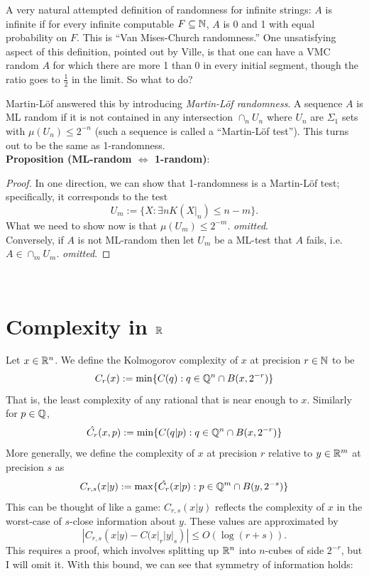 \documentclass{amsart}
\begin{document}
	A very natural attempted definition of randomness for infinite strings: $A$ is infinite if for every infinite computable $F\subseteq \mathbb{N}$, $A$ is 0 and 1 with equal probability on $F$. This is ``Van Mises-Church randomness.'' One unsatisfying aspect of this definition, pointed out by Ville, is that one can have a VMC random $A$ for which there are more 1 than 0 in every initial segment, though the ratio goes to $\tfrac12$ in the limit. So what to do?
	
	Martin-L\"of answered this by introducing \textit{Martin-L\"of randomness}. A sequence $A$ is ML random if it is not contained in any intersection $\cap_n U_n$ where $U_n$ are $\Sigma_1$ sets with $\mu(U_n)\leq 2^{-n}$ (such a sequence is called a ``Martin-L\"of test''). This turns out to be the same as 1-randomness.\\
	
	\textbf{Proposition (ML-random $\iff$ 1-random)}: 
	\begin{proof}
		In one direction, we can show that 1-randomness is a Martin-L\"of test; specifically, it corresponds to the test
		$$
		U_m := \{X : \exists n K(X|_n) \leq n-m\}.
		$$
		What we need to show now is that $\mu(U_m)\leq 2^{-m}$. \textit{omitted}.\\
		
		Conversely, if $A$ is not ML-random then let $U_m$ be a ML-test that $A$ fails, i.e. $A\in \cap_m U_m$. \textit{omitted}.
	\end{proof}\\
	
	\section{Complexity in $\mathbb{R}$} 
	
	Let $x\in \mathbb{R}^n$. We define the Kolmogorov complexity of $x$ at precision $r\in \mathbb{N}$ to be 
	$$
	C_r(x) := \min\{C(q): q\in \mathbb{Q}^n \cap B(x,2^{-r})\}
	$$
	That is, the least complexity of any rational that is near enough to $x$. Similarly for $p\in \mathbb{Q}$,
	$$
	\hat{C_r}(x,p) := \min\{C(q|p) : q\in \mathbb{Q}^n\cap B(x,2^{-r})\}
	$$
	More generally, we define the complexity of $x$ at precision $r$ relative to $y\in \mathbb{R}^m$ at precision $s$ as
	$$
	C_{r,s}(x|y) := \max\{\hat{C_r}(x|p) : p\in \mathbb{Q}^m\cap B(y,2^{-s})\}
	$$
	This can be thought of like a game: $C_{r,s}(x|y)$ reflects the complexity of $x$ in the worst-case of $s$-close information about $y$. These values are approximated by
	$$
	|C_{r,s}(x|y) - C(x|_r | y|_s)| \leq O(\log(r+s)).
	$$
	This requires a proof, which involves splitting up $\mathbb{R}^n$ into $n$-cubes of side $2^{-r}$, but I will omit it. With this bound, we can see that symmetry of information holds:\\
	
\end{document}
